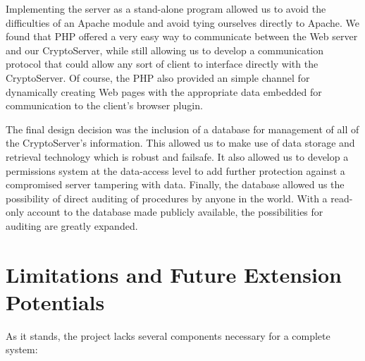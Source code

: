 \documentclass[letterpaper,10pt]{article}
\begin{document}
Implementing the server as a stand-alone program allowed us to avoid
the difficulties of an Apache module and avoid tying ourselves
directly to Apache. We found that PHP offered a very easy way to
communicate between the Web server and our CryptoServer, while still
allowing us to develop a communication protocol that could allow any
sort of client to interface directly with the CryptoServer. Of
course, the PHP also provided an simple channel for dynamically
creating Web pages with the appropriate data embedded for
communication to the client's browser plugin.

The final design decision was the inclusion of a database for
management of all of the CryptoServer's information. This allowed us
to make use of data storage and retrieval technology which is robust
and failsafe. It also allowed us to develop a permissions system at
the data-access level to add further protection against a compromised
server tampering with data. Finally, the database allowed us the
possibility of direct auditing of procedures by anyone in the world.
With a read-only account to the database made publicly available, the
possibilities for auditing are greatly expanded.

\section{Limitations and Future Extension Potentials}

As it stands, the project lacks several components necessary for a
complete system:
\end{document}
